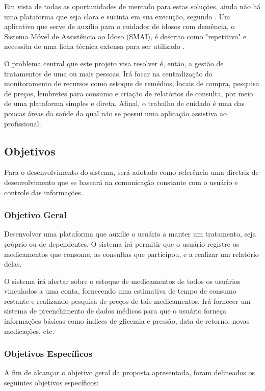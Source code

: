 \documentclass[
	article,			%
	12pt,				%
	oneside,			%
	a4paper,			%
    BIBLATEX,           %
	english,			%
	brazil,				%
	sumario=tradicional
	]{abntex2}
\begin{document}
Em vista de todas as oportunidades de mercado para estas soluções, ainda não há uma plataforma que seja clara e sucinta em sua execução, segundo . Um aplicativo que serve de auxílio para o cuidador de idosos com demência, o Sistema Móvel de Assistência ao Idoso (SMAI), é descrito como "repetitivo" e necessita de uma ficha técnica extensa para ser utilizado \cite{andre2020}.

O problema central que este projeto visa resolver é, então, a gestão de tratamentos de uma ou mais pessoas. Irá focar na centralização do monitoramento de recursos como estoque de remédios, locais de compra, pesquisa de preços, lembretes para consumo e criação de relatórios de consulta, por meio de uma plataforma simples e direta. Afinal, o trabalho de cuidado é uma das poucas áreas da saúde da qual não se possui uma aplicação assistiva ao profissional.

\subsection{Objetivos}

Para o desenvolvimento do sistema, será adotado como referência uma diretriz de desenvolvimento que se baseará na comunicação constante com o usuário e controle das informações.

\subsubsection{Objetivo Geral}

Desenvolver uma plataforma que auxilie o usuário a manter um tratamento, seja próprio ou de dependentes. O sistema irá permitir que o usuário registre os medicamentos que consome, as consultas que participou, e a realizar um relatório delas.

O sistema irá alertar sobre o estoque de medicamentos de todos os usuários vinculados a uma conta, fornecendo uma estimativa de tempo de consumo restante e realizando pesquisa de preços de tais medicamentos. Irá fornecer um sistema de preenchimento de dados médicos para que o usuário forneça informações básicas como índices de glicemia e pressão, data de retorno, novas medicações, etc.

\subsubsection{Objetivos Específicos}

A fim de alcançar o objetivo geral da proposta apresentada, foram delineados os seguintes objetivos específicos:
\end{document}
